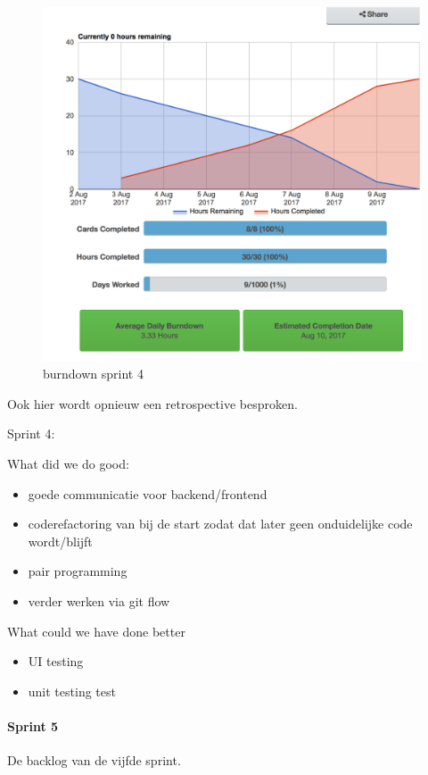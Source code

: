 \begin{figure}[h]
	\centering
\includegraphics[width=15cm]{img/burndown_week4.png}
\caption{burndown sprint 4}
\end{figure}

Ook hier wordt opnieuw een retrospective besproken.

Sprint 4:

What did we do good:

\begin{itemize}
\item goede communicatie voor backend/frontend
\item coderefactoring van bij de start zodat dat later geen onduidelijke code wordt/blijft
\item pair programming
\item verder werken via git flow
\end{itemize}

What could we have done better

\begin{itemize}
\item UI testing
\item unit testing test
\end{itemize}

\paragraph{Sprint 5}
De backlog van de vijfde sprint.

